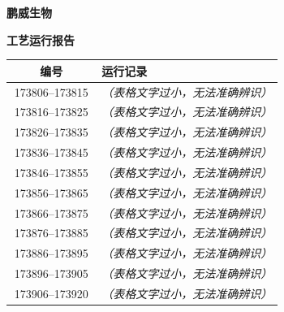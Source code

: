 \documentclass[UTF8,10pt,a4paper,fontset=fandol]{ctexart}
\begin{document}
\noindent
\begin{minipage}[t]{0.48\textwidth}
\centering
\textbf{鹏威生物}\par
\vspace{1mm}
\textbf{工艺运行报告}\par
\vspace{1mm}
\begin{tabular}{|c|p{0.67\linewidth}|}
\hline
\textbf{编号} & \textbf{运行记录} \\ \hline
173806--173815 & \textit{（表格文字过小，无法准确辨识）} \\ \hline
173816--173825 & \textit{（表格文字过小，无法准确辨识）} \\ \hline
173826--173835 & \textit{（表格文字过小，无法准确辨识）} \\ \hline
173836--173845 & \textit{（表格文字过小，无法准确辨识）} \\ \hline
173846--173855 & \textit{（表格文字过小，无法准确辨识）} \\ \hline
173856--173865 & \textit{（表格文字过小，无法准确辨识）} \\ \hline
173866--173875 & \textit{（表格文字过小，无法准确辨识）} \\ \hline
173876--173885 & \textit{（表格文字过小，无法准确辨识）} \\ \hline
173886--173895 & \textit{（表格文字过小，无法准确辨识）} \\ \hline
173896--173905 & \textit{（表格文字过小，无法准确辨识）} \\ \hline
173906--173920 & \textit{（表格文字过小，无法准确辨识）} \\ \hline
\end{tabular}
\end{minipage}
\hfill
\end{document}

